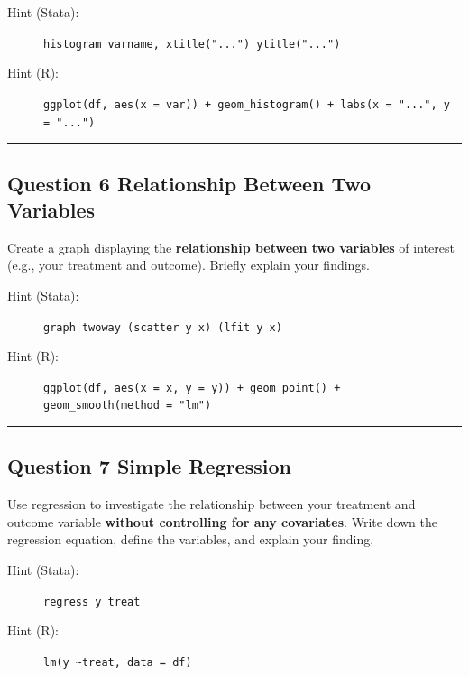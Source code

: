 \documentclass[paper=a4, fontsize=11pt]{scrartcl}
\newcommand{\horrule}[1]{\rule{\linewidth}{#1}}
\begin{document}
\begin{description}
  \item[Hint (Stata):] \texttt{histogram varname, xtitle("...") ytitle("...")}
  \item[Hint (R):] \texttt{ggplot(df, aes(x = var)) + geom\_histogram() + labs(x = "...", y = "...")}
\end{description}

\bigskip\horrule{0.4pt}\bigskip


\subsection*{Question 6 \quad Relationship Between Two Variables}

Create a graph displaying the \textbf{relationship between two variables} of interest (e.g., your treatment and outcome). Briefly explain your findings.

\begin{description}
  \item[Hint (Stata):] \texttt{graph twoway (scatter y x) (lfit y x)}
  \item[Hint (R):] \texttt{ggplot(df, aes(x = x, y = y)) + geom\_point() + geom\_smooth(method = "lm")}
\end{description}

\bigskip\horrule{0.4pt}\bigskip


\subsection*{Question 7 \quad Simple Regression}

Use regression to investigate the relationship between your treatment and outcome variable \textbf{without controlling for any covariates}. Write down the regression equation, define the variables, and explain your finding.

\begin{description}
  \item[Hint (Stata):] \texttt{regress y treat}
  \item[Hint (R):] \texttt{lm(y \textasciitilde treat, data = df)}
\end{description}
\end{document}
